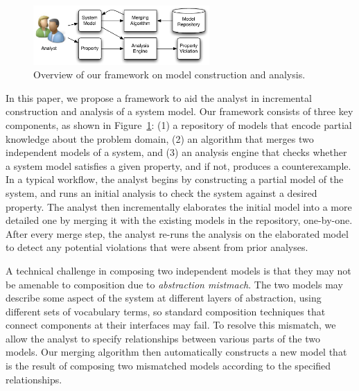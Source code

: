 \begin{figure}[!t]
\centering
\includegraphics[width=0.60\textwidth]{diagrams/overview}
\caption{Overview of our framework on model construction and analysis.}
\label{fig-overview}
\end{figure}

In this paper, we propose a framework to aid the analyst in
incremental construction and analysis of a system model. Our framework
consists of three key components, as shown in
Figure~\ref{fig-overview}: (1) a repository of models that encode
partial knowledge about the problem domain, (2) an algorithm that
merges two independent models of a system, and (3) an analysis engine
that checks whether a system model satisfies a given property, and if
not, produces a counterexample. In a typical workflow, the analyst
begins by constructing a partial model of the system, and runs an
initial analysis to check the system against a desired property. The
analyst then incrementally elaborates the initial model into a more
detailed one by merging it with the existing models in the repository,
one-by-one. After every merge step, the analyst re-runs the
analysis on the elaborated model to detect any potential violations
that were absent from prior analyses.

A technical challenge in composing two independent models is that they
may not be amenable to composition due to \textit{abstraction
  mistmach}. The two models may describe some aspect of the system at
different layers of abstraction, using different sets of vocabulary
terms, so standard composition techniques that connect components at
their interfaces may fail. To resolve this mismatch, we allow the
analyst to specify relationships between various parts of the two
models. Our merging algorithm then automatically constructs a new
model that is the result of composing two mismatched models according
to the specified relationships.

